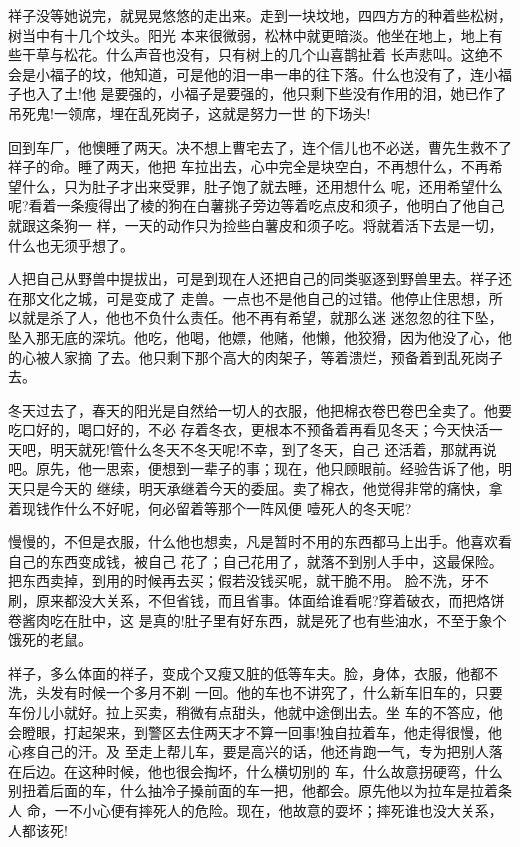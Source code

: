 \documentclass[11pt,a4paper,onecolumn]{article}
\begin{document}
祥子没等她说完，就晃晃悠悠的走出来。走到一块坟地，四四方方的种着些松树，树当中有十几个坟头。阳光
本来很微弱，松林中就更暗淡。他坐在地上，地上有些干草与松花。什么声音也没有，只有树上的几个山喜鹊扯着
长声悲叫。这绝不会是小福子的坟，他知道，可是他的泪一串一串的往下落。什么也没有了，连小福子也入了土!他
是要强的，小福子是要强的，他只剩下些没有作用的泪，她已作了吊死鬼!一领席，埋在乱死岗子，这就是努力一世
的下场头!

回到车厂，他懊睡了两天。决不想上曹宅去了，连个信儿也不必送，曹先生救不了祥子的命。睡了两天，他把
车拉出去，心中完全是块空白，不再想什么，不再希望什么，只为肚子才出来受罪，肚子饱了就去睡，还用想什么
呢，还用希望什么呢?看着一条瘦得出了棱的狗在白薯挑子旁边等着吃点皮和须子，他明白了他自己就跟这条狗一
样，一天的动作只为捡些白薯皮和须子吃。将就着活下去是一切，什么也无须乎想了。

人把自己从野兽中提拔出，可是到现在人还把自己的同类驱逐到野兽里去。祥子还在那文化之城，可是变成了
走兽。一点也不是他自己的过错。他停止住思想，所以就是杀了人，他也不负什么责任。他不再有希望，就那么迷
迷忽忽的往下坠，坠入那无底的深坑。他吃，他喝，他嫖，他赌，他懒，他狡猾，因为他没了心，他的心被人家摘
了去。他只剩下那个高大的肉架子，等着溃烂，预备着到乱死岗子去。

冬天过去了，春天的阳光是自然给一切人的衣服，他把棉衣卷巴卷巴全卖了。他要吃口好的，喝口好的，不必
存着冬衣，更根本不预备着再看见冬天；今天快活一天吧，明天就死!管什么冬天不冬天呢!不幸，到了冬天，自己
还活着，那就再说吧。原先，他一思索，便想到一辈子的事；现在，他只顾眼前。经验告诉了他，明天只是今天的
继续，明天承继着今天的委屈。卖了棉衣，他觉得非常的痛快，拿着现钱作什么不好呢，何必留着等那个一阵风便
噎死人的冬天呢?

慢慢的，不但是衣服，什么他也想卖，凡是暂时不用的东西都马上出手。他喜欢看自己的东西变成钱，被自己
花了；自己花用了，就落不到别人手中，这最保险。把东西卖掉，到用的时候再去买；假若没钱买呢，就干脆不用。
脸不洗，牙不刷，原来都没大关系，不但省钱，而且省事。体面给谁看呢?穿着破衣，而把烙饼卷酱肉吃在肚中，这
是真的!肚子里有好东西，就是死了也有些油水，不至于象个饿死的老鼠。

祥子，多么体面的祥子，变成个又瘦又脏的低等车夫。脸，身体，衣服，他都不洗，头发有时候一个多月不剃
一回。他的车也不讲究了，什么新车旧车的，只要车份儿小就好。拉上买卖，稍微有点甜头，他就中途倒出去。坐
车的不答应，他会瞪眼，打起架来，到警区去住两天才不算一回事!独自拉着车，他走得很慢，他心疼自己的汗。及
至走上帮儿车，要是高兴的话，他还肯跑一气，专为把别人落在后边。在这种时候，他也很会掏坏，什么横切别的
车，什么故意拐硬弯，什么别扭着后面的车，什么抽冷子搡前面的车一把，他都会。原先他以为拉车是拉着条人
命，一不小心便有摔死人的危险。现在，他故意的耍坏；摔死谁也没大关系，人都该死!
\end{document}
